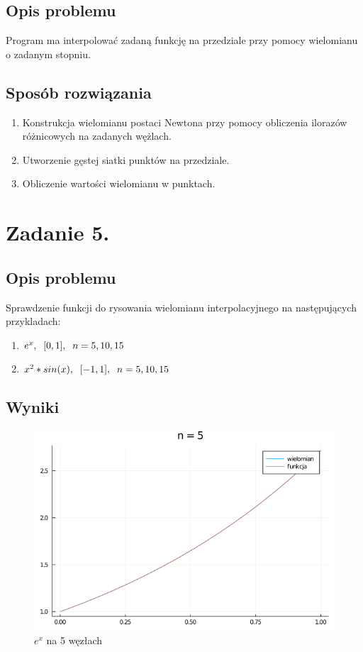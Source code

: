 \documentclass[12pt]{article}
\begin{document}
\subsection{Opis problemu}
Program ma interpolować zadaną funkcję na przedziale przy pomocy wielomianu o zadanym stopniu.
\subsection{Sposób rozwiązania}
\begin{enumerate}
    \item Konstrukcja wielomianu postaci Newtona przy pomocy obliczenia ilorazów różnicowych na zadanych wężlach.
    \item Utworzenie gęstej siatki punktów na przedziale.
    \item Obliczenie wartości wielomianu w punktach.
\end{enumerate}

\section{Zadanie 5.}

\subsection{Opis problemu}
Sprawdzenie funkcji do rysowania wielomianu interpolacyjnego na następujących przykladach:
\begin{enumerate}
    \item $e^x,\hspace{0.2cm} [0,1],\hspace{0.2cm} n = 5, 10, 15$
    \item $x^2 * sin(x),\hspace{0.2cm} [-1,1],\hspace{0.2cm} n = 5, 10, 15$
\end{enumerate}
\newpage
\subsection{Wyniki}

\begin{figure}[h!]
    \caption{$e^x$ na 5 węzłach}
    \centering
    \includegraphics[scale=0.5]{z5f_5.png}
\end{figure}
\end{document}
